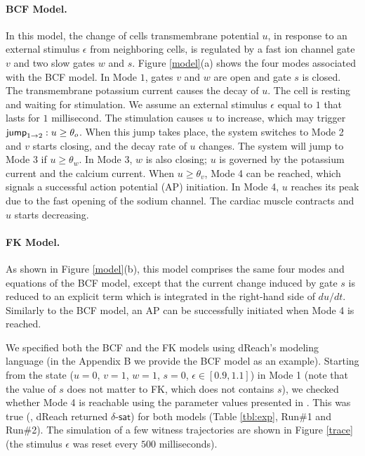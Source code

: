 \paragraph{BCF Model.}
In this model, the change of cells transmembrane potential $u$, in response to an external stimulus $\epsilon$ from neighboring cells, is regulated by a fast ion channel gate $v$ and two slow gates $w$ and $s$.
Figure \ref{model}(a) shows the four modes associated with the BCF model. In Mode $1$, gates $v$ and $w$ are open and gate $s$ is closed. The transmembrane potassium current causes the decay of $u$. The cell is resting and waiting for stimulation. We assume an external stimulus $\epsilon$ equal to $1$ that lasts for $1$ millisecond. The stimulation causes $u$ to increase, which may trigger $\mathsf{jump}_{1 \rightarrow 2}: u \geq \theta_o$. When this jump takes place, the system switches to Mode 2 and $v$ starts closing, and the decay rate of $u$ changes. The system will jump to Mode 3 if $u \geq \theta_w$. In Mode 3, $w$ is also closing; $u$ is governed by the potassium current and the calcium current. When $u \geq \theta_v$, Mode 4 can be reached, which signals a successful action potential (AP) initiation. In Mode 4, $u$ reaches its peak due to the fast opening of the sodium channel. The cardiac muscle contracts and $u$ starts decreasing.
\vspace{-2ex}
\paragraph{FK Model.}
As shown in Figure \ref{model}(b), this model comprises the same four modes and equations of the BCF model, except that the current change induced by gate $s$ is reduced to an explicit term which is integrated in the right-hand side of $du/dt$. Similarly to the BCF model, an AP can be successfully initiated when Mode 4 is reached.

We specified both the BCF and the FK models using dReach's modeling language (in the Appendix B we provide the
BCF model as an example). Starting from the state ($u = 0$, $v = 1$, $w = 1$, $s = 0$, $\epsilon \in [0.9, 1.1]$) in Mode 1 (note that the value of $s$ does not matter to FK, which does not contains $s$), we checked whether Mode 4 is reachable using the parameter values presented in \cite{orovio08}. This was true (\ie, dReach returned $\delta$-$\mathsf{sat}$) for both models (Table \ref{tbl:exp}, Run\#1 and Run\#2).
The simulation of a few witness trajectories are shown in Figure \ref{trace} (the stimulus $\epsilon$ was reset every $500$ milliseconds).


